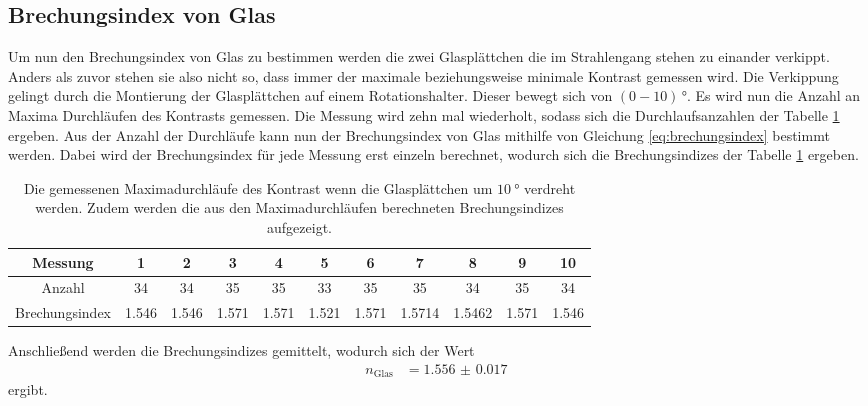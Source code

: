 \subsection{Brechungsindex von Glas}
Um nun den Brechungsindex von Glas zu bestimmen werden die zwei Glasplättchen die im Strahlengang stehen zu einander verkippt.
Anders als zuvor stehen sie also nicht so, dass immer der maximale beziehungsweise minimale Kontrast gemessen wird.
Die Verkippung gelingt durch die Montierung der Glasplättchen auf einem Rotationshalter.
Dieser bewegt sich von $(0-10)\,\si{\degree}$.
Es wird nun die Anzahl an Maxima Durchläufen des Kontrasts gemessen.
Die Messung wird zehn mal wiederholt, sodass sich die Durchlaufsanzahlen der Tabelle \ref{tab:n_glas} ergeben.
Aus der Anzahl der Durchläufe kann nun der Brechungsindex von Glas mithilfe von Gleichung \eqref{eq:brechungsindex} bestimmt werden.
Dabei wird der Brechungsindex für jede Messung erst einzeln berechnet, wodurch sich die Brechungsindizes der Tabelle \ref{tab:n_glas} ergeben.
\begin{table}
    \hspace*{-1cm}
    \begin{tabular}{ccccccccccc}
        \toprule 
        Messung & 1&2&3&4&5&6&7&8&9&10\\
        \midrule
        Anzahl &34 & 34& 35& 35& 33& 35& 35& 34& 35& 34\\
        Brechungsindex &1.546&1.546&1.571&1.571&1.521&1.571& 1.5714&1.5462&1.571& 1.546\\
        \bottomrule
    \end{tabular}
    \caption{Die gemessenen Maximadurchläufe des Kontrast wenn die Glasplättchen um $\SI{10}{\degree}$ verdreht werden.
    Zudem werden die aus den Maximadurchläufen berechneten Brechungsindizes aufgezeigt.}
    \label{tab:n_glas}
\end{table}
\FloatBarrier\noindent
Anschließend werden die Brechungsindizes gemittelt, wodurch sich der Wert 
\begin{align*}
    n_\text{Glas} &= \SI{1.556(17)}{}
\end{align*}
ergibt.
